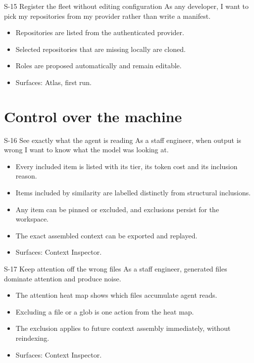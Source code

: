 \begin{story}{S-15 \quad Register the fleet without editing configuration}
As any developer, I want to pick my repositories from my provider rather than write a manifest.
\end{story}
\begin{itemize}
  \item Repositories are listed from the authenticated provider.
  \item Selected repositories that are missing locally are cloned.
  \item Roles are proposed automatically and remain editable.
  \item Surfaces: Atlas, first run.
\end{itemize}

\section{Control over the machine}

\begin{story}{S-16 \quad See exactly what the agent is reading}
As a staff engineer, when output is wrong I want to know what the model was looking at.
\end{story}
\begin{itemize}
  \item Every included item is listed with its tier, its token cost and its inclusion reason.
  \item Items included by similarity are labelled distinctly from structural inclusions.
  \item Any item can be pinned or excluded, and exclusions persist for the workspace.
  \item The exact assembled context can be exported and replayed.
  \item Surfaces: Context Inspector.
\end{itemize}

\begin{story}{S-17 \quad Keep attention off the wrong files}
As a staff engineer, generated files dominate attention and produce noise.
\end{story}
\begin{itemize}
  \item The attention heat map shows which files accumulate agent reads.
  \item Excluding a file or a glob is one action from the heat map.
  \item The exclusion applies to future context assembly immediately, without reindexing.
  \item Surfaces: Context Inspector.
\end{itemize}

